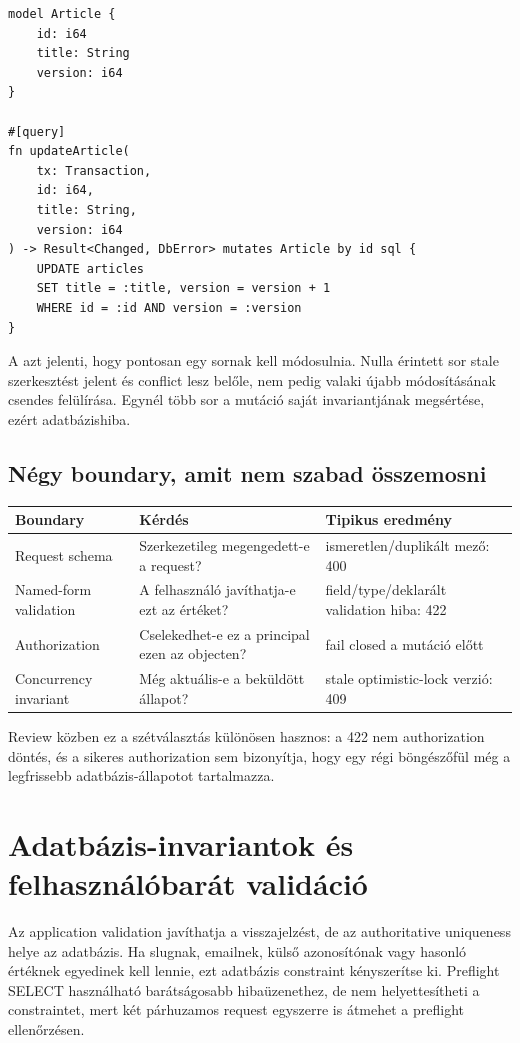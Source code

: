 \begin{lstlisting}[language=Velran]
model Article {
    id: i64
    title: String
    version: i64
}

#[query]
fn updateArticle(
    tx: Transaction,
    id: i64,
    title: String,
    version: i64
) -> Result<Changed, DbError> mutates Article by id sql {
    UPDATE articles
    SET title = :title, version = version + 1
    WHERE id = :id AND version = :version
}
\end{lstlisting}

A  azt jelenti, hogy pontosan egy sornak kell módosulnia. Nulla érintett sor stale szerkesztést jelent és conflict lesz belőle, nem pedig valaki újabb módosításának csendes felülírása. Egynél több sor a mutáció saját invariantjának megsértése, ezért adatbázishiba.

\subsection*{Négy boundary, amit nem szabad összemosni}

\begin{longtable}{L{0.20\textwidth}L{0.31\textwidth}L{0.39\textwidth}}
\toprule
Boundary & Kérdés & Tipikus eredmény \\
\midrule
Request schema & Szerkezetileg megengedett-e a request? & ismeretlen/duplikált mező: 400 \\
Named-form validation & A felhasználó javíthatja-e ezt az értéket? & field/type/deklarált validation hiba: 422 \\
Authorization & Cselekedhet-e ez a principal ezen az objecten? & fail closed a mutáció előtt \\
Concurrency invariant & Még aktuális-e a beküldött állapot? & stale optimistic-lock verzió: 409 \\
\bottomrule
\end{longtable}

Review közben ez a szétválasztás különösen hasznos: a 422 nem authorization döntés, és a sikeres authorization sem bizonyítja, hogy egy régi böngészőfül még a legfrissebb adatbázis-állapotot tartalmazza.

\section{Adatbázis-invariantok és felhasználóbarát validáció}

Az application validation javíthatja a visszajelzést, de az authoritative uniqueness helye az adatbázis. Ha slugnak, emailnek, külső azonosítónak vagy hasonló értéknek egyedinek kell lennie, ezt adatbázis  constraint kényszerítse ki. Preflight SELECT használható barátságosabb hibaüzenethez, de nem helyettesítheti a constraintet, mert két párhuzamos request egyszerre is átmehet a preflight ellenőrzésen.

